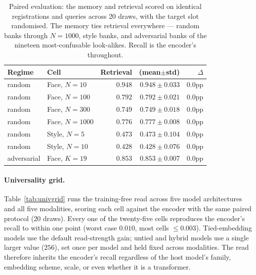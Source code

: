 \begin{table}[h]
\small\centering
\caption{Paired evaluation: the memory and retrieval scored on identical registrations and queries across 20 draws, with the target slot randomised. The memory ties retrieval everywhere --- random banks through $N{=}1000$, style banks, and adversarial banks of the nineteen most-confusable look-alikes. Recall is the encoder's throughout.}
\label{tab:headline}
\begin{tabular}{@{}llrrr@{}}
\toprule
\textbf{Regime} & \textbf{Cell} & \textbf{Retrieval} & \textbf{\attmem{} (mean$\pm$std)} & \textbf{$\Delta$} \\
\midrule
random      & Face, $N{=}10$        & $0.948$ & $0.948 \pm 0.033$ & $0.0$pp \\
random      & Face, $N{=}100$       & $0.792$ & $0.792 \pm 0.021$ & $0.0$pp \\
random      & Face, $N{=}300$       & $0.749$ & $0.749 \pm 0.018$ & $0.0$pp \\
random      & Face, $N{=}1000$      & $0.776$ & $0.777 \pm 0.008$ & $0.0$pp \\
random      & Style, $N{=}5$        & $0.473$ & $0.473 \pm 0.104$ & $0.0$pp \\
random      & Style, $N{=}10$       & $0.428$ & $0.428 \pm 0.076$ & $0.0$pp \\
adversarial & Face, $K{=}19$        & $0.853$ & $0.853 \pm 0.007$ & $0.0$pp \\
\bottomrule
\end{tabular}
\end{table}

\paragraph{Universality grid.} Table~\ref{tab:univgrid} runs the training-free read across five model architectures and all five modalities, scoring each cell against the encoder with the same paired protocol (20 draws). Every one of the twenty-five cells reproduces the encoder's recall to within one point (worst case $0.010$, most cells $\le 0.003$). Tied-embedding models use the default read-strength gain; untied and hybrid models use a single larger value ($256$), set once per model and held fixed across modalities. The read therefore inherits the encoder's recall regardless of the host model's family, embedding scheme, scale, or even whether it is a transformer.

